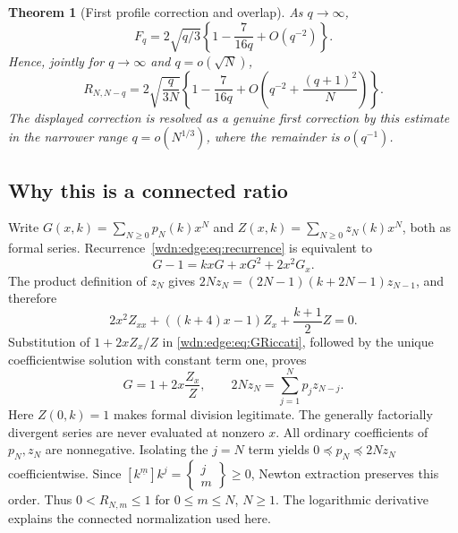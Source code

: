 \documentclass[11pt,letterpaper]{article}
\newtheorem{theorem}{Theorem}[section]
\theoremstyle{remark}\newtheorem{remark}[theorem]{Remark}
\newcommand{\fall}[2]{#1^{\underline{#2}}}
\newcommand{\stir}[2]{\left\{\begin{matrix}#1\\#2\end{matrix}\right\}}
\begin{document}
\begin{theorem}[First profile correction and overlap]\label{wdn:edge:thm:matching}
As $q\to\infty$,
\begin{equation}\label{wdn:edge:eq:Ffirst}
 F_q=2\sqrt{q/3}\left\{1-\frac7{16q}+O(q^{-2})\right\}.
\end{equation}
Hence, jointly for $q\to\infty$ and $q=o(\sqrt N)$,
\begin{equation}\label{wdn:edge:eq:Rfirst}
 R_{N,N-q}=2\sqrt{\frac q{3N}}
 \left\{1-\frac7{16q}
 +O\left(q^{-2}+\frac{(q+1)^2}{N}\right)\right\}.
\end{equation}
The displayed correction is resolved as a genuine first correction by
this estimate in the narrower range $q=o(N^{1/3})$, where the remainder
is $o(q^{-1})$.
\end{theorem}

\subsection{Why this is a connected ratio}\label{wdn:edge:sub:connected}
Write $G(x,k)=\sum_{N\ge0}p_N(k)x^N$ and
$Z(x,k)=\sum_{N\ge0}z_N(k)x^N$, both as formal series.
Recurrence~\eqref{wdn:edge:eq:recurrence} is equivalent to
\begin{equation}\label{wdn:edge:eq:GRiccati}
 G-1=kxG+xG^2+2x^2G_x.
\end{equation}
The product definition of $z_N$ gives
$2Nz_N=(2N-1)(k+2N-1)z_{N-1}$, and therefore
\[
 2x^2Z_{xx}+((k+4)x-1)Z_x+\frac{k+1}{2}Z=0.
\]
Substitution of $1+2xZ_x/Z$ in \eqref{wdn:edge:eq:GRiccati}, followed by the unique
coefficientwise solution with constant term one, proves
\begin{equation}\label{wdn:edge:eq:connected}
 G=1+2x\frac{Z_x}{Z},\qquad
 2Nz_N=\sum_{j=1}^Np_jz_{N-j}.
\end{equation}
Here $Z(0,k)=1$ makes formal division legitimate. The generally factorially
divergent series are never evaluated at nonzero $x$.
All ordinary coefficients of $p_N,z_N$ are nonnegative. Isolating the
$j=N$ term yields $0\preceq p_N\preceq2Nz_N$ coefficientwise.
Since $[\fall{k}{m}]k^j=\stir jm\ge0$, Newton extraction preserves
this order. Thus $0<R_{N,m}\le1$ for $0\le m\le N$, $N\ge1$.
The logarithmic derivative explains the connected normalization used here.
\end{document}

